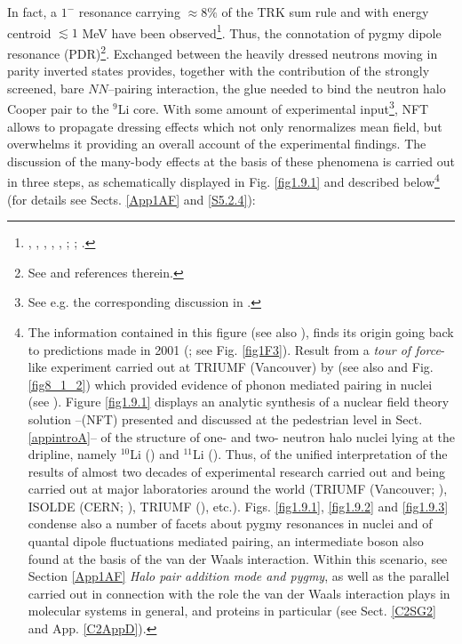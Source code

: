  In fact, a $1^-$ resonance carrying $\approx 8\%$ of the TRK sum rule and with energy centroid  $\lesssim 1$ MeV have been observed\footnote{\label{f119C2} \cite{Zinser:97}, \cite{Nakamura:06}, \cite{Shimoura:95}, \cite{Ieki:93}, \cite{Sackett:93},  \cite{Kobayashi:89}; \cite{Kanungo:15}; \cite{Aumann:19}.}. Thus, the connotation of pygmy dipole  resonance (PDR)\footnote{See \cite{Broglia:19} and references therein.}. Exchanged between the heavily dressed neutrons moving in  parity inverted states provides, together with the contribution of the strongly screened, bare $NN$--pairing interaction, the glue needed to bind the neutron halo Cooper pair to the $^9$Li core. With some amount of experimental input\footnote{See e.g. the corresponding discussion in \cite{Barranco:17}.}, NFT allows to propagate dressing effects which not only renormalizes mean field, but overwhelms it providing an overall account of the experimental findings.
The discussion of the many-body effects at the basis of these phenomena is carried out   in three steps, as schematically displayed in Fig. \ref{fig1.9.1} and described below\footnote{The information contained in this figure (see also \cite{Broglia:19b}), finds its origin going back to predictions made in 2001 (\cite{Barranco:01}; see Fig. \ref{fig1F3}). Result from a \textit{tour of force}-like experiment carried out at TRIUMF (Vancouver) by \cite{Tanihata:08} (see also \cite{Tanihata:13} and Fig. \ref{fig8_1_2}) which provided evidence of phonon mediated pairing in nuclei (see \cite{Potel:10}). Figure \ref{fig1.9.1} displays an analytic synthesis of a nuclear field theory solution --(NFT) presented and discussed at the pedestrian level in Sect. \ref{appintroA}-- of the structure of one- and two- neutron halo nuclei lying at the dripline, namely $^{10}$Li (\cite{Barranco:20}) and $^{11}$Li (\cite{Barranco:01}). Thus, of the unified interpretation of the results of almost two decades of experimental research carried out and being carried out at major laboratories around the world (TRIUMF (Vancouver; \cite{Tanihata:08}), ISOLDE (CERN; \cite{Jeppesen:06}), TRIUMF (\cite{Cavallaro:17}), etc.). Figs. \ref{fig1.9.1}, \ref{fig1.9.2} and \ref{fig1.9.3} condense also a number of facets about pygmy resonances in nuclei  and of quantal dipole fluctuations mediated pairing, an intermediate boson also found at the basis of the van der Waals interaction. Within this scenario, see  Section  \ref{App1AF} \textit{Halo pair addition mode and pygmy}, as well as the parallel carried out in connection with the role the van der Waals interaction plays in molecular systems in general, and proteins in particular (see Sect. \ref{C2SG2} and App. \ref{C2AppD}).
} (for details see Sects. \ref{App1AF} and \ref{S5.2.4}):


